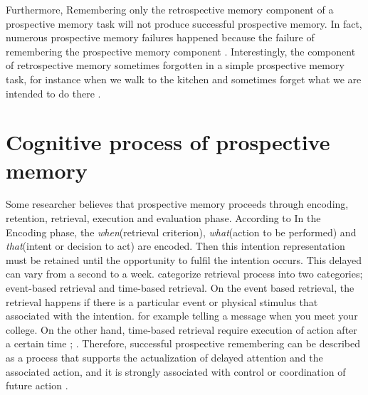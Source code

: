 Furthermore, Remembering only the retrospective memory component of a prospective memory task will not produce successful prospective memory. In fact, numerous prospective memory failures happened because the failure of remembering the prospective memory component
\citep{einsteindGuynn1992}. Interestingly, the component of retrospective memory sometimes forgotten in a simple prospective memory task, for instance when we walk to the kitchen and sometimes forget what we are intended to do there \citep{brandimonte1996prospective}.


\section{Cognitive process of prospective memory}


Some researcher believes that prospective memory proceeds  through encoding, retention, retrieval, execution and evaluation phase.
According to \cite{inside1996prospective} In the Encoding phase, the \textit{when}(retrieval criterion), \textit{what}(action to be performed) and \textit{that}(intent or decision to act) are encoded. Then this intention representation must be retained until the opportunity to fulfil the intention occurs. This delayed can vary from a second to a week. \cite{EinsteinGillesO.1990NAaP} categorize  retrieval process into two categories;
event-based retrieval and time-based retrieval. On the event based retrieval, the retrieval happens if there is a particular event or physical stimulus that associated with the intention. for example telling a message when you meet your college. On the other hand,
time-based retrieval require execution of action after a certain time  \citep{inside1996prospective};   \citep{Mcgann2002}.
Therefore, successful prospective remembering can be described as a process that supports the actualization of
delayed attention and the associated action,
 and it is strongly associated with control or coordination of future action \citep{inside1996prospective}.


